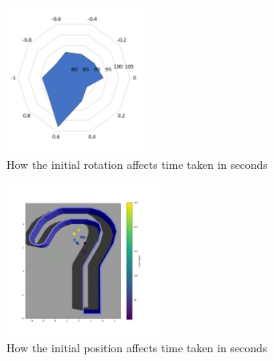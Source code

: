 \documentclass[conference]{IEEEtran}
\begin{document}
\begin{figure}[H]
    \centering
    \includegraphics[width=0.4\textwidth]{images/Rotation_timings.png}
    \caption{How the initial rotation affects time taken in seconds}
    \label{fig:rotation_radar_chart}
\end{figure}

\begin{figure}[H]
    \centering
    \includegraphics[width=0.45\textwidth]{images/heatMap_position.png}
    \caption{How the initial position affects time taken in seconds}
    \label{fig:position_heat_map}
\end{figure}
\end{document}
